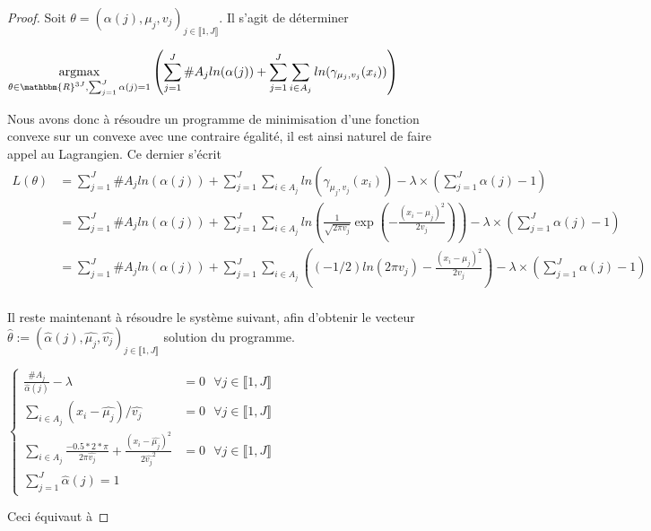 \documentclass[frenchb]{report}
\newcommand{\R}{\mathbbm{R}}
\newcommand{\1}{\mathbbm{1}}
\theoremstyle{definition}\newtheorem{defn}{Définition}
\theoremstyle{definition}\newtheorem{exm}{Exemple}
\theoremstyle{definition}\newtheorem{nota}{Notation}
\theoremstyle{definition}\newtheorem{rem}{Remarque}
\begin{document}
\begin{proof}
Soit $\theta = (\alpha(j), \mu_j, v_j)_{j \in \llbracket 1,J \rrbracket}$. Il s'agit de déterminer 
\begin{center}
	$\underset{\theta\in\R^{3J}, \sum_{j=1}^J\alpha(j) = 1}{\text{argmax}}\left(\displaystyle\sum_{j=1}^J \#A_j ln(\alpha(j))+ \sum_{j=1}^J\sum_{i\in A_j} ln(\gamma_{\mu_j, v_j}(x_i))\right)$
\end{center}
Nous avons donc à résoudre un programme de minimisation d'une fonction convexe sur un convexe avec une contraire égalité, il est ainsi naturel de faire appel au Lagrangien. \newline 
Ce dernier s'écrit
\begin{align*} 
L(\theta) &= \displaystyle\sum_{j=1}^J \#A_j ln(\alpha(j))+ \sum_{j=1}^J\sum_{i\in A_j} ln(\gamma_{\mu_j, v_j}(x_i)) - \lambda\times\left(\sum_{j=1}^J\alpha(j) - 1\right)\\
&= \displaystyle\sum_{j=1}^J \#A_j ln(\alpha(j))+ \sum_{j=1}^J\sum_{i\in A_j} ln\left(\frac{1}{\sqrt{2\pi v_j}}\exp\left(-\frac{\left(x_i -\mu_j\right)^2}{2v_j} \right)\right) - \lambda\times\left(\sum_{j=1}^J\alpha(j) - 1\right)\\
&= \displaystyle\sum_{j=1}^J \#A_j ln(\alpha(j))+ \sum_{j=1}^J\sum_{i\in A_j}\left( (-1/2)ln(2\pi v_j) -\frac{(x_i-\mu_j)^2}{2v_j}\right) - \lambda\times\left(\sum_{j=1}^J\alpha(j) - 1\right)\\
\end{align*}

Il reste maintenant à résoudre le système suivant, afin d'obtenir le vecteur $\hat{\theta} := (\hat{\alpha}(j), \hat{\mu_j}, \hat{v_j})_{j\in\llbracket 1,J \rrbracket}$ solution du programme.

$
\begin{cases}
\displaystyle\frac{\#A_j}{\hat{\alpha}(j)} - \lambda &= 0 \text{ } \forall j \in \llbracket 1,J \rrbracket \\
\displaystyle\sum_{i\in A_j} (x_i-\hat{\mu_j})/\hat{v_j} & = 0 \text{ } \forall j \in \llbracket 1,J \rrbracket \\
\displaystyle\sum_{i\in A_j} \frac{-0.5 * 2 * \pi}{2\pi \hat{v_j}} +\frac{(x_i-\hat{\mu_j})^2}{2\hat{v_j}^2} &= 0 \text{ } \forall j \in \llbracket 1,J \rrbracket\\
\displaystyle\sum_{j=1}^J \hat{\alpha}(j) = 1
\end{cases}
$

Ceci équivaut à 


\end{proof}
\end{document}
